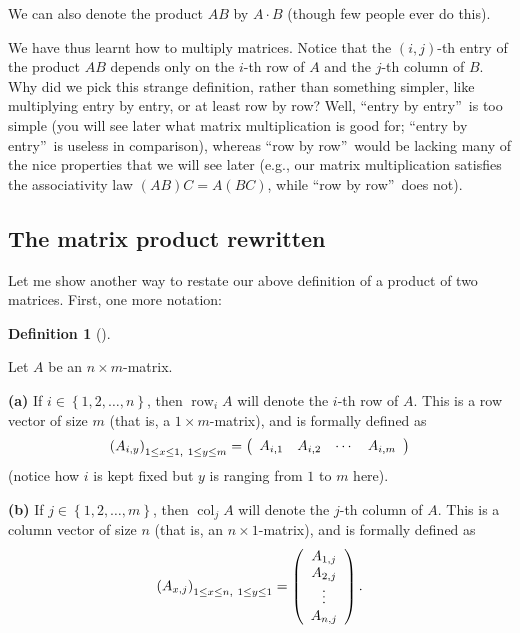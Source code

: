 \documentclass[numbers=enddot,12pt,final,onecolumn,notitlepage]{scrartcl}%
\theoremstyle{definition}
\newtheorem{defi}[theo]{Definition}
\newenvironment{definition}[1][]
{\begin{defi}[#1]\begin{leftbar}}
{\end{leftbar}\end{defi}}
\begin{document}
We can also denote the product $AB$ by $A\cdot B$ (though few people ever do this).

We have thus learnt how to multiply matrices. Notice that the $\left(
i,j\right)  $-th entry of the product $AB$ depends only on the $i$-th row of
$A$ and the $j$-th column of $B$. Why did we pick this strange definition,
rather than something simpler, like multiplying entry by entry, or at least
row by row? Well, \textquotedblleft entry by entry\textquotedblright\ is too
simple (you will see later what matrix multiplication is good for;
\textquotedblleft entry by entry\textquotedblright\ is useless in comparison),
whereas \textquotedblleft row by row\textquotedblright\ would be lacking many
of the nice properties that we will see later (e.g., our matrix multiplication
satisfies the associativity law $\left(  AB\right)  C=A\left(  BC\right)  $,
while \textquotedblleft row by row\textquotedblright\ does not).

\subsection{The matrix product rewritten}

Let me show another way to restate our above definition of a product of two
matrices. First, one more notation:

\begin{definition}
Let $A$ be an $n\times m$-matrix.

\textbf{(a)} If $i\in\left\{  1,2,\ldots,n\right\}  $, then
$\operatorname*{row}\nolimits_{i}A$ will denote the $i$-th row of $A$. This is
a row vector of size $m$ (that is, a $1\times m$-matrix), and is formally
defined as
\[
\left(  A_{i,y}\right)  _{1\leq x\leq1,\ 1\leq y\leq m}=\left(
\begin{array}
[c]{cccc}%
A_{i,1} & A_{i,2} & \cdots & A_{i,m}%
\end{array}
\right)
\]
(notice how $i$ is kept fixed but $y$ is ranging from $1$ to $m$ here).

\textbf{(b)} If $j\in\left\{  1,2,\ldots,m\right\}  $, then
$\operatorname*{col}\nolimits_{j}A$ will denote the $j$-th column of $A$. This
is a column vector of size $n$ (that is, an $n\times1$-matrix), and is
formally defined as
\[
\left(  A_{x,j}\right)  _{1\leq x\leq n,\ 1\leq y\leq1}=\left(
\begin{array}
[c]{c}%
A_{1,j}\\
A_{2,j}\\
\vdots\\
A_{n,j}%
\end{array}
\right)  .
\]

\end{definition}
\end{document}
